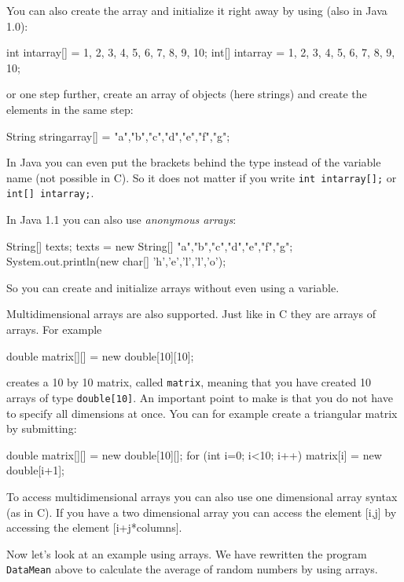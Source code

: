 You can also create the array and initialize it right away by using
(also in Java 1.0):
\begin{sverbatim}
  int intarray[] = {1, 2, 3, 4, 5, 6, 7, 8, 9, 10};
  int[] intarray = {1, 2, 3, 4, 5, 6, 7, 8, 9, 10};
\end{sverbatim}
or one step further, create an array of objects (here strings) and
create the elements in the same step:
\begin{sverbatim}
  String stringarray[] = {"a","b","c","d","e","f","g"};
\end{sverbatim}
In Java you can even put the brackets behind the type instead of the
variable name (not possible in C). So it does not matter if you
write \verb|int intarray[];| or \verb|int[] intarray;|.

In Java 1.1 you can also use \emph{anonymous arrays}:
\begin{sverbatim}
  String[] texts;
  texts = new String[] {"a","b","c","d","e","f","g"};
  System.out.println(new char[] {'h','e','l','l','o'});
\end{sverbatim}
So you can create and initialize arrays without even using a variable.

Multidimensional arrays are also supported. Just like in C they are
arrays of arrays. For example
\begin{sverbatim}
  double matrix[][] = new double[10][10]; 
\end{sverbatim}
creates a 10 by 10 matrix, called \verb|matrix|, 
meaning that you have created 10 arrays
of type \verb|double[10]|. An important point to make is that you
do not have to specify all dimensions at once. You can for example
create a triangular matrix by submitting:
\begin{sverbatim}
  double matrix[][] = new double[10][];
  for (int i=0; i<10; i++) {
         matrix[i] = new double[i+1];
  } 
\end{sverbatim}
To access multidimensional arrays you can also use one dimensional
array syntax (as in C). If you have a two dimensional array 
you can access the element [i,j] by accessing the element [i+j*columns]. 

Now let's look at an example using arrays. We have rewritten the program
\verb|DataMean| above to calculate the average of random 
numbers by using arrays.


